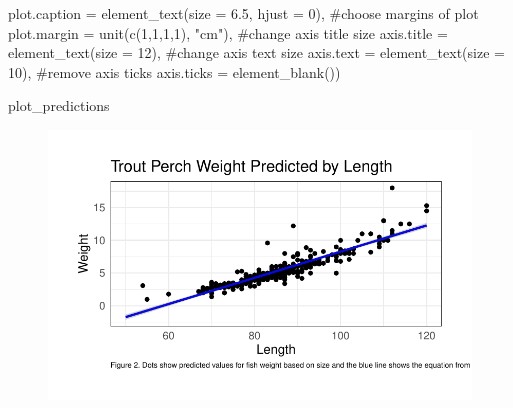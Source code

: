 \documentclass[
  letterpaper,
  DIV=11,
  numbers=noendperiod]{scrartcl}
\newenvironment{Shaded}{\begin{snugshade}}{\end{snugshade}}
\newcommand{\AttributeTok}[1]{\textcolor[rgb]{0.40,0.45,0.13}{#1}}
\newcommand{\CommentTok}[1]{\textcolor[rgb]{0.37,0.37,0.37}{#1}}
\newcommand{\DecValTok}[1]{\textcolor[rgb]{0.68,0.00,0.00}{#1}}
\newcommand{\FloatTok}[1]{\textcolor[rgb]{0.68,0.00,0.00}{#1}}
\newcommand{\FunctionTok}[1]{\textcolor[rgb]{0.28,0.35,0.67}{#1}}
\newcommand{\NormalTok}[1]{\textcolor[rgb]{0.00,0.23,0.31}{#1}}
\newcommand{\StringTok}[1]{\textcolor[rgb]{0.13,0.47,0.30}{#1}}
\begin{document}
\begin{Shaded}
\begin{Highlighting}[]
        \AttributeTok{plot.caption =} \FunctionTok{element\_text}\NormalTok{(}\AttributeTok{size =} \FloatTok{6.5}\NormalTok{, }\AttributeTok{hjust =} \DecValTok{0}\NormalTok{),}
        \CommentTok{\#choose margins of plot }
        \AttributeTok{plot.margin =} \FunctionTok{unit}\NormalTok{(}\FunctionTok{c}\NormalTok{(}\DecValTok{1}\NormalTok{,}\DecValTok{1}\NormalTok{,}\DecValTok{1}\NormalTok{,}\DecValTok{1}\NormalTok{), }\StringTok{"cm"}\NormalTok{),}
        \CommentTok{\#change axis title size}
        \AttributeTok{axis.title =} \FunctionTok{element\_text}\NormalTok{(}\AttributeTok{size =} \DecValTok{12}\NormalTok{), }
        \CommentTok{\#change axis text size }
        \AttributeTok{axis.text =} \FunctionTok{element\_text}\NormalTok{(}\AttributeTok{size =} \DecValTok{10}\NormalTok{),}
        \CommentTok{\#remove axis ticks }
        \AttributeTok{axis.ticks =} \FunctionTok{element\_blank}\NormalTok{())}
      

\NormalTok{plot\_predictions}
\end{Highlighting}
\end{Shaded}

\begin{figure}[H]

{\centering \includegraphics{ENVS-193DS-Homework-4_files/figure-pdf/unnamed-chunk-7-1.pdf}

}

\end{figure}
\end{document}
